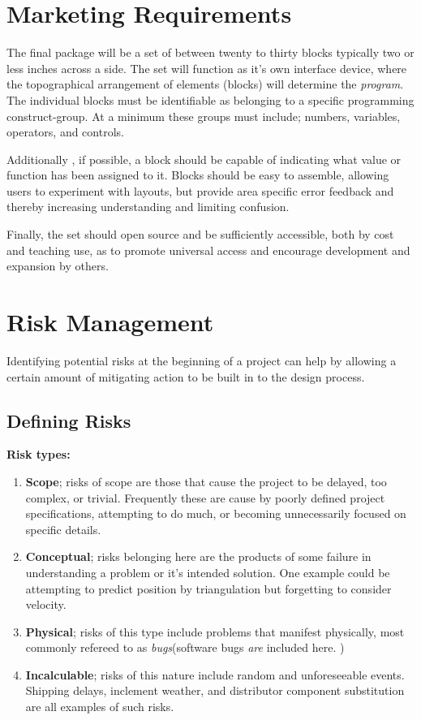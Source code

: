 \section{Marketing Requirements}


The final package will be a set of between twenty to thirty blocks typically two or less inches across a side. The set will function as it's own interface device, where the topographical arrangement of elements (blocks) will determine the \textit{program}. The individual blocks must be identifiable as belonging to a specific programming construct-group. At a minimum these groups must include; numbers, variables, operators, and controls.

Additionally , if possible, a block should be capable of indicating what  value or function has been  assigned to it. Blocks should be easy to assemble,  allowing users to experiment with layouts, but provide area specific error feedback and thereby increasing understanding and limiting confusion.

Finally, the set should open source and be sufficiently accessible, both by cost and teaching use, as to promote universal access and encourage development and expansion by others.



\section{Risk Management}
Identifying potential risks  at the beginning of a project can help by allowing a certain amount of mitigating action to be built in to the design process.
\subsection{Defining Risks}

 \hspace{.35cm} \textbf{Risk types:}
 \begin{enumerate}
 \item \textbf{Scope}; risks of scope are those that cause the project to be delayed, too complex, or trivial. Frequently these are cause by poorly defined project specifications, attempting to do much, or becoming unnecessarily focused on specific details.
 \item \textbf{Conceptual}; risks belonging here are the products of some failure in understanding a problem or it's intended solution. One example could be  attempting to predict position by triangulation but forgetting to consider velocity.
 \item \textbf{Physical}; risks of this type include problems that manifest physically, most commonly refereed to as \textit{bugs}(software bugs \textit{are} included here. )
 \item \textbf{Incalculable}; risks of this nature include random and unforeseeable events. Shipping delays, inclement weather, and distributor component substitution are all examples of such risks.
 \end{enumerate}
